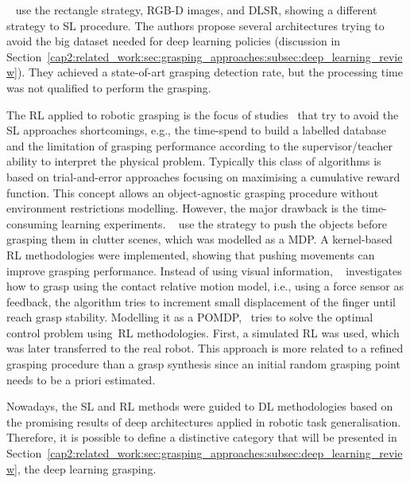 \citeauthor{Trottier2017}~\cite{Trottier2017} use the rectangle strategy, RGB-D images, and \ac{DLSR}, showing a different strategy to \ac{SL} procedure. The authors propose several architectures trying to avoid the big dataset needed for deep learning policies (discussion in Section~\ref{cap2:related_work:sec:grasping_approaches:subsec:deep_learning_review}). They achieved a state-of-art grasping detection rate, but the processing time was not qualified to perform the grasping. %

The \ac{RL} applied to robotic grasping is the focus of studies~\cite{Bernd2002,BaierLowenstein2007, boularias2015learning, platt2007learning} that try to avoid the \ac{SL} approaches shortcomings, e.g., the time-spend to build a labelled database and the limitation of grasping performance according to the supervisor/teacher ability to interpret the physical problem. Typically this class of algorithms is based on trial-and-error approaches focusing on maximising a cumulative reward function. This concept allows an object-agnostic grasping procedure without environment restrictions modelling. However, the major drawback is the time-consuming learning experiments. \citeauthor{boularias2015learning}~\cite{boularias2015learning} use the strategy to push the objects before grasping them in clutter scenes, which was modelled as a \ac{MDP}. A kernel-based \ac{RL} methodologies were implemented, showing that pushing movements can improve grasping performance. Instead of using visual information, \citeauthor{platt2007learning}~\cite{platt2007learning} investigates how to grasp using the contact relative motion model, i.e., using a force sensor as feedback, the algorithm tries to increment small displacement of the finger until reach grasp stability. Modelling it as a \ac{POMDP},~\cite{platt2007learning} tries to solve the optimal control problem using~\ac{RL} methodologies. First, a simulated \ac{RL} was used, which was later transferred to the real robot. This approach is more related to a refined grasping procedure than a grasp synthesis since an initial random grasping point needs to be a priori estimated.

Nowadays, the \ac{SL} and  \ac{RL}  methods were guided to \ac{DL} methodologies based on the promising results of deep architectures applied in robotic task generalisation. Therefore, it is possible to define a distinctive category that will be presented in Section~\ref{cap2:related_work:sec:grasping_approaches:subsec:deep_learning_review}, the deep learning grasping.


